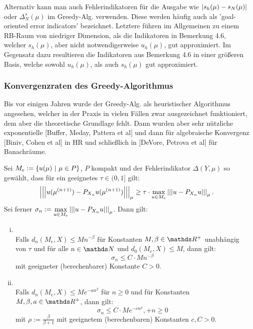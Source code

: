 Alternativ kann man auch Fehlerindikatoren für die Ausgabe wie $\left\vert s_h(\mu)-s_N(\mu)\right\vert$ oder $\Delta_N^s(\mu)$ im Greedy-Alg. verwenden.
Diese werden häufig auch als 'goal-oriented error indicators' bezeichnet.
Letztere führen im Allgemeinen zu einem RB-Raum von niedriger Dimension, als die Indikatoren in Bemerkung 4.6, welcher $s_h(\mu)$, aber nicht notwendigerweise $u_h(\mu)$, gut approximiert.
Im Gegensatz dazu resultieren die Indikatoren aus Bemerkung 4.6 in einer größeren Basis, welche sowohl $u_h(\mu)$, als auch $s_h(\mu)$ gut approximiert.

\subsubsection{Konvergenzraten des Greedy-Algorithmus}
Bis vor einigen Jahren wurde der Greedy-Alg. als heuristischer Algorithmus angesehen, welcher in der Praxis in vielen Fällen zwar ausgezeichnet funktioniert, dem aber die theoretische Grundlage fehlt.
Dann wurden aber sehr nützliche exponentielle [Buffer, Meday, Pattera et al] und dann für algebraische Konvergenz [Biniv, Cohen et al] in HR und schließlich in [DeVore, Petrova et al] für Banachräume.

Sei $M_e := \left\{u(\mu)~|~\mu\in P\right\}$, $P$ kompakt und der Fehlerindikator $\Delta(Y,\mu)$ so gewählt, dass für ein geeignetes $\tau\in (0,1]$ gilt:
\begin{align}
\left|\left|\left|u(\mu^{(n+1)})-P_{X_n} u(\mu^{(n+1)})\right|\right|\right|_\mu \ge \tau \cdot \max\limits_{u\in M_e} \left|\left|\left|u-P_{X_n}u\right|\right|\right|_\mu.
\end{align} 
Sei ferner $\sigma_n := \max\limits_{u\in M_e} \left|\left|\left|u-P_{X_n}u\right|\right|\right|_\mu$.
Dann gilt:
\begin{enumerate}[(i)]
	\item {}\\
	Falls $d_n(M_e,X)\le M n^{-\beta}$ für Konstanten $M,\beta\in \R^+$ unabhängig von $\tau$ und für alle $n\in \N$ und $d_0(M_e,X)\le M$, dann gilt:
	\[
	\sigma_n \le C\cdot Mn^{-\beta}
	\]
	mit geeigneter (berechenbarer) Konstante $C>0$.
	\item {}\\
	Falls $d_n(M_e,X) \le M e^{-an^\beta}$ für $n\ge 0$ und für Konstanten $M,\beta, a\in \R^+$, dann gilt:
	\[
	\sigma_n\le C\cdot Me^{-cn^\rho}, +n\ge 0
	\]
	mit $\rho := \frac{\beta}{\beta+1}$ mit geeignetem (berechenbaren) Konstanten $c,C>0$.
\end{enumerate}

